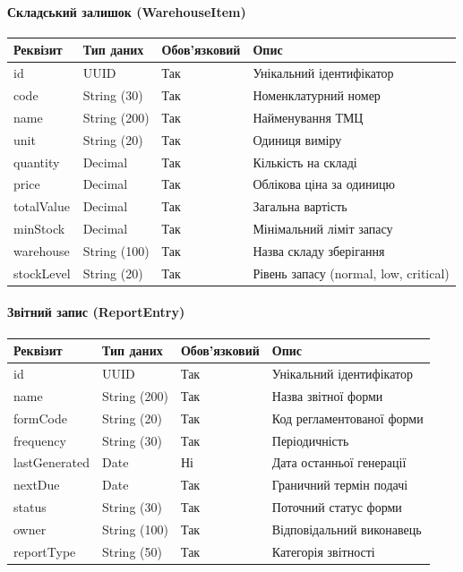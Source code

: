 \documentclass{article}
\begin{document}
\paragraph{Складський залишок (WarehouseItem)}
\begin{longtable}{p{3.5cm}p{3.5cm}p{2cm}p{5cm}}
\toprule
\textbf{Реквізит} & \textbf{Тип даних} & \textbf{Обов'язковий} & \textbf{Опис} \\
\midrule
id & UUID & Так & Унікальний ідентифікатор \\
code & String (30) & Так & Номенклатурний номер \\
name & String (200) & Так & Найменування ТМЦ \\
unit & String (20) & Так & Одиниця виміру \\
quantity & Decimal & Так & Кількість на складі \\
price & Decimal & Так & Облікова ціна за одиницю \\
totalValue & Decimal & Так & Загальна вартість \\
minStock & Decimal & Так & Мінімальний ліміт запасу \\
warehouse & String (100) & Так & Назва складу зберігання \\
stockLevel & String (20) & Так & Рівень запасу (normal, low, critical) \\
\bottomrule
\end{longtable}

\paragraph{Звітний запис (ReportEntry)}
\begin{longtable}{p{3.5cm}p{3.5cm}p{2cm}p{5cm}}
\toprule
\textbf{Реквізит} & \textbf{Тип даних} & \textbf{Обов'язковий} & \textbf{Опис} \\
\midrule
id & UUID & Так & Унікальний ідентифікатор \\
name & String (200) & Так & Назва звітної форми \\
formCode & String (20) & Так & Код регламентованої форми \\
frequency & String (30) & Так & Періодичність \\
lastGenerated & Date & Ні & Дата останньої генерації \\
nextDue & Date & Так & Граничний термін подачі \\
status & String (30) & Так & Поточний статус форми \\
owner & String (100) & Так & Відповідальний виконавець \\
reportType & String (50) & Так & Категорія звітності \\
\bottomrule
\end{longtable}
\end{document}
